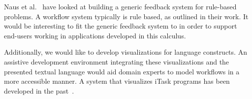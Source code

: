 Naus et al.~\cite{UUCS2017013} have looked at building a generic feedback system for rule-based problems.
A workflow system typically is rule based, as outlined in their work.
It would be interesting to fit the generic feedback system to \TOPHAT in order to support end-users working in applications developed in this calculus.


Additionally, we would like to develop visualizations for \TOPHAT language constructs.
An assistive development environment integrating these visualizations and the presented textual language
would aid domain experts to model workflows in a more accessible manner.
A system that visualizes iTask programs has been developed in the past~\cite{DBLP:conf/sfp/StutterheimPA14}.

